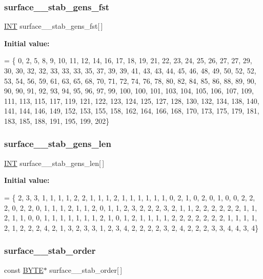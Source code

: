 \subsubsection{\texorpdfstring{surface\+\_\+\_\+stab\+\_\+gens\+\_\+fst}{surface\_43\_stab\_gens\_fst}}
{\footnotesize\ttfamily \mbox{\hyperlink{galois_8h_a09fddde158a3a20bd2dcadb609de11dc}{I\+NT}} surface\+\_\+\_\+stab\+\_\+gens\+\_\+fst\mbox{[}$\,$\mbox{]}}

{\bfseries Initial value\+:}
\begin{DoxyCode}
= \{ 0, 2, 5, 8, 9, 10, 11, 12, 14, 16, 
    17, 18, 19, 21, 22, 23, 24, 25, 26, 27, 
    27, 29, 30, 30, 32, 32, 33, 33, 33, 35, 
    37, 39, 39, 41, 43, 43, 44, 45, 46, 48, 
    49, 50, 52, 52, 53, 54, 56, 59, 61, 63, 
    65, 68, 70, 71, 72, 74, 76, 78, 80, 82, 
    84, 85, 86, 88, 89, 90, 90, 90, 91, 92, 
    93, 94, 95, 96, 97, 99, 100, 100, 101, 103, 
    104, 105, 106, 107, 109, 111, 113, 115, 117, 119, 
    121, 122, 123, 124, 125, 127, 128, 130, 132, 134, 
    138, 140, 141, 144, 146, 149, 152, 153, 155, 158, 
    162, 164, 166, 168, 170, 173, 175, 179, 181, 183, 
    185, 188, 191, 195, 199, 202\}
\end{DoxyCode}
\mbox{\label{surface__43_8_c_a55c7d33c5454dbbb734c4073a95943cc}} 
\subsubsection{\texorpdfstring{surface\+\_\+\_\+stab\+\_\+gens\+\_\+len}{surface\_43\_stab\_gens\_len}}
{\footnotesize\ttfamily \mbox{\hyperlink{galois_8h_a09fddde158a3a20bd2dcadb609de11dc}{I\+NT}} surface\+\_\+\_\+stab\+\_\+gens\+\_\+len\mbox{[}$\,$\mbox{]}}

{\bfseries Initial value\+:}
\begin{DoxyCode}
= \{ 2, 3, 3, 1, 1, 1, 1, 2, 2, 1, 
    1, 1, 2, 1, 1, 1, 1, 1, 1, 0, 
    2, 1, 0, 2, 0, 1, 0, 0, 2, 2, 
    2, 0, 2, 2, 0, 1, 1, 1, 2, 1, 
    1, 2, 0, 1, 1, 2, 3, 2, 2, 2, 
    3, 2, 1, 1, 2, 2, 2, 2, 2, 2, 
    1, 1, 2, 1, 1, 0, 0, 1, 1, 1, 
    1, 1, 1, 1, 2, 1, 0, 1, 2, 1, 
    1, 1, 1, 2, 2, 2, 2, 2, 2, 2, 
    1, 1, 1, 1, 2, 1, 2, 2, 2, 4, 
    2, 1, 3, 2, 3, 3, 1, 2, 3, 4, 
    2, 2, 2, 2, 3, 2, 4, 2, 2, 2, 
    3, 3, 4, 4, 3, 4\}
\end{DoxyCode}
\mbox{\label{surface__43_8_c_a161d9c7ac6cb3956fcd8392ded70c45c}} 
\subsubsection{\texorpdfstring{surface\+\_\+\_\+stab\+\_\+order}{surface\_43\_stab\_order}}
{\footnotesize\ttfamily const \mbox{\hyperlink{galois_8h_ab6cc7b4aeb6ea31aba2b3fbfc83ff5e6}{B\+Y\+TE}}$\ast$ surface\+\_\+\_\+stab\+\_\+order\mbox{[}$\,$\mbox{]}}

